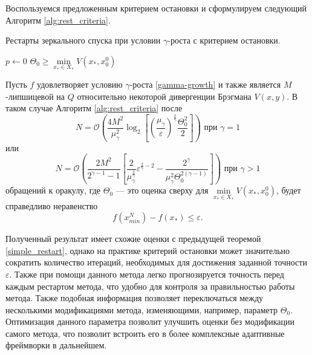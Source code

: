 Воспользуемся предложенным критерием остановки и сформулируем следующий Алгоритм \ref{alg:rest_criteria}. 
 \begin{algorithm}[htp]
    \caption{Рестарты зеркального спуска при условии $\gamma$-роста с критерием остановки.}
    \label{alg:rest_criteria}
    $p \gets 0$\;
    $\Theta_0 \geq \min\limits_{x_* \in X_*}{V(x_*,x_0^0)}$\;
\end{algorithm}
\begin{theorem}
    Пусть $f$ удовлетворяет условию $\gamma$-роста \eqref{gamma-growth} и также является $M$-липшицевой на $Q$ относительно некоторой дивергенции Брэгмана $V(x, y)$. В таком случае Алгоритм \ref{alg:rest_criteria} после 
    \begin{equation}
       N = \mathcal{O} \left( \frac{4 M^2}{\mu_{\gamma}^2} \log_2{\left[\left(\frac{\mu_{\gamma}}{\varepsilon}\right)^{\frac{2}{\gamma}} \frac{\Theta_0^2}{2}\right]}\right) \text{ при } \gamma = 1
    \end{equation}
    или
    \begin{equation}
       N = \mathcal{O}\left( \frac{2 M^2 }{2^{\gamma - 1} - 1}\left[ \frac{2}{\mu_{\gamma}^{\frac{2}{\gamma}}}\varepsilon^{\frac{2}{\gamma} - 2} - \frac{2^{\gamma}}{\mu_{\gamma}^2 \Theta_0^{2(\gamma - 1)}} \right] \right) \text{ при } \gamma > 1
    \end{equation}
    обращений к оракулу, где $\Theta_0$ --- это оценка сверху для $\min\limits_{x_* \in X_*}{V(x_*, x_0^0)}$, будет справедливо неравенство
    \begin{equation}
        f(x_{min}^N) - f(x_*) \leq \varepsilon.
    \end{equation}
\end{theorem}

Полученный результат имеет схожие оценки с предыдущей теоремой \ref{simple_restart}, однако на практике критерий остановки может значительно сократить количество итераций, необходимых для достижения заданной точности $\varepsilon$. Также при помощи данного метода легко прогнозируется точность перед каждым рестартом метода, что удобно для контроля за правильностью работы метода. Также подобная информация позволяет переключаться между несколькими модификациями метода, изменяющими, например, параметр $\Theta_0$. Оптимизация данного параметра позволит улучшить оценки без модификации самого метода, что позволит встроить его в более комплексные адаптивные фреймворки в дальнейшем. 

